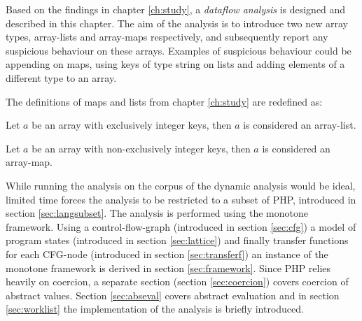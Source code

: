 Based on the findings in chapter \ref{ch:study}, a \emph{dataflow analysis} is designed and described in this chapter. The aim of the analysis is to introduce two new array types, array-lists and array-maps respectively, and subsequently report any suspicious behaviour on these arrays. Examples of suspicious behaviour could be appending on maps, using keys of type string on lists and adding elements of a different type to an array.

The definitions of maps and lists from chapter \ref{ch:study} are redefined as:

\begin{definition}
Let $a$ be an array with exclusively integer keys, then $a$ is considered an array-list.
\label{def:newList}
\end{definition}

\begin{definition}
Let $a$ be an array with non-exclusively integer keys, then $a$ is considered an array-map.
\label{def:newMap}
\end{definition}

While running the analysis on the corpus of the dynamic analysis would be ideal, limited time forces the analysis to be restricted to a subset of PHP, introduced in section \ref{sec:langsubset}. The analysis is performed using the monotone framework. Using a control-flow-graph (introduced in section \ref{sec:cfg}) a model of program states (introduced in section \ref{sec:lattice}) and finally transfer functions for each CFG-node (introduced in section \ref{sec:transferf}) an instance of the monotone framework is derived in section \ref{sec:framework}. Since PHP relies heavily on coercion, a separate section (section \ref{sec:coercion}) covers coercion of abstract values. Section \ref{sec:abseval} covers abstract evaluation and in section \ref{sec:worklist} the implementation of the analysis is briefly introduced.

